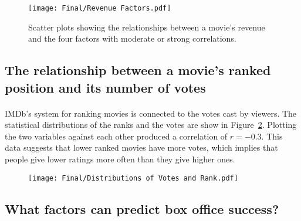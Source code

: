 \begin{multicols}{2}
                \begin{figure}[H]
                    \centering
                    \texttt{[image: Final/Revenue Factors.pdf]}
                    \caption{
                        Scatter plots showing the relationships between a movie's revenue and the four
                        factors with moderate or strong correlations.
                    }\label{fig-revenue-factors}
                \end{figure}
        \end{multicols}

    \subsection{The relationship between a movie's ranked position and its number of votes}
        \begin{multicols}{2}
            \paragraph{}
                IMDb's system for ranking movies is connected to the votes cast by viewers.
                The statistical distributions of the ranks and the votes are show in
                    Figure~\ref{fig-rank-vote-dist}.
                Plotting the two variables against each other produced a correlation of
                    $r=-0.3$.
                This data suggests that lower ranked movies have more votes, which implies that
                    people give lower ratings more often than they give higher ones.

                \begin{figure}[H]
                    \centering
                    \texttt{[image: Final/Distributions of Votes and Rank.pdf]}
                    \caption{}\label{fig-rank-vote-dist}
                \end{figure}
        \end{multicols}

    \subsection{What factors can predict box office success?}

